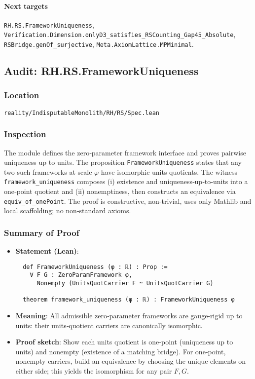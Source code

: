 \documentclass{article}
\newcommand{\FileRef}[1]{\texttt{#1}}
\begin{document}
\paragraph{Next targets} \texttt{RH.RS.FrameworkUniqueness}, \texttt{Verification.Dimension.onlyD3\_satisfies\_RSCounting\_Gap45\_Absolute}, \texttt{RSBridge.genOf\_surjective}, \texttt{Meta.AxiomLattice.MPMinimal}.

\subsection{Audit: RH.RS.FrameworkUniqueness}
\subsubsection{Location}
\FileRef{reality/IndisputableMonolith/RH/RS/Spec.lean}

\subsubsection{Inspection}
The module defines the zero‑parameter framework interface and proves pairwise uniqueness up to units. The proposition \texttt{FrameworkUniqueness} states that any two such frameworks at scale \(\varphi\) have isomorphic units quotients. The witness \texttt{framework\_uniqueness} composes (i) existence and uniqueness‑up‑to‑units into a one‑point quotient and (ii) nonemptiness, then constructs an equivalence via \texttt{equiv\_of\_onePoint}. The proof is constructive, non‑trivial, uses only Mathlib and local scaffolding; no non‑standard axioms.

\subsubsection{Summary of Proof}
\begin{itemize}[leftmargin=*]
  \item \textbf{Statement (Lean)}:
  \begin{lstlisting}
  def FrameworkUniqueness (φ : ℝ) : Prop :=
    ∀ F G : ZeroParamFramework φ,
      Nonempty (UnitsQuotCarrier F ≃ UnitsQuotCarrier G)

  theorem framework_uniqueness (φ : ℝ) : FrameworkUniqueness φ
  \end{lstlisting}
  \item \textbf{Meaning}: All admissible zero‑parameter frameworks are gauge‑rigid up to units: their units‑quotient carriers are canonically isomorphic.
  \item \textbf{Proof sketch}: Show each units quotient is one‑point (uniqueness up to units) and nonempty (existence of a matching bridge). For one‑point, nonempty carriers, build an equivalence by choosing the unique elements on either side; this yields the isomorphism for any pair \(F,G\).
\end{itemize}
\end{document}
